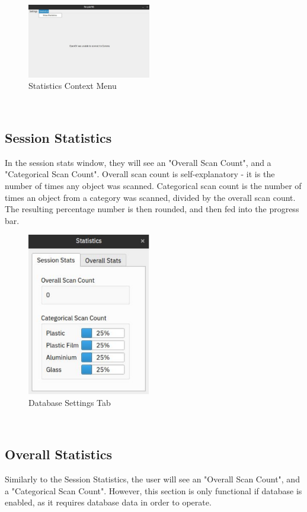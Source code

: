 \documentclass[conference]{IEEEtran}
\begin{document}
\begin{figure}[h]
    \centering
    \includegraphics[width=0.48\textwidth]{images/stats_context_menu.eps}
    \caption{Statistics Context Menu}
\end{figure}~\\

\subsection{Session Statistics}
In the session stats window, they will see an "Overall Scan Count", and a "Categorical Scan Count". Overall scan count is self-explanatory - it is the number of times any object was scanned. Categorical scan count is the number of times an object from a category was scanned, divided by the overall scan count. The resulting percentage number is then rounded, and then fed into the progress bar.~\\

\begin{figure}[h]
    \centering
    \includegraphics[width=0.48\textwidth]{images/statistics_session.eps}
    \caption{Database Settings Tab}
\end{figure}~\\

\subsection{Overall Statistics}
Similarly to the Session Statistics, the user will see an "Overall Scan Count", and a "Categorical Scan Count". However, this section is only functional if database is enabled, as it requires database data in order to operate.~\\
\end{document}
